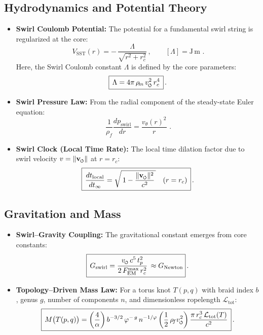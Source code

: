 \documentclass[11pt]{article}
\newcommand{\swirlarrow}{%
    \mathchoice{\mkern-2mu\scriptstyle\boldsymbol{\circlearrowleft}}%
    {\mkern-2mu\scriptstyle\boldsymbol{\circlearrowleft}}%
    {\mkern-2mu\scriptscriptstyle\boldsymbol{\circlearrowleft}}%
    {\mkern-2mu\scriptscriptstyle\boldsymbol{\circlearrowleft}}%
}
\newcommand{\vswirl}{\mathbf{v}_{\swirlarrow}}
\newcommand{\vscore}{v_{\swirlarrow}}                    %
\newcommand{\rhof}{\rho_{\!f}}                           %
\newcommand{\rhom}{\rho_{\!m}}                           %
\newcommand{\rc}{r_c}                                    %
\newcommand{\FmaxEM}{F_{\mathrm{EM}}^{\max}}             %
\begin{document}
\subsection*{Hydrodynamics and Potential Theory}
    \begin{itemize}
    \item \textbf{Swirl Coulomb Potential:} The potential for a fundamental swirl string is regularized at the core:
    \[ \boxed{\,V_{\text{SST}}(r)=-\,\frac{\Lambda}{\sqrt{r^2+\rc^2}}\,,\qquad [\Lambda]=\mathrm{J\,m}\,}\,. \]
    Here, the Swirl Coulomb constant $\Lambda$ is defined by the core parameters:
    \[ \boxed{\,\Lambda = 4\pi\,\rhom\,\vscore^2\,\rc^4\,}\,. \]
    \item \textbf{Swirl Pressure Law:} From the radial component of the steady-state Euler equation:
    \[ \boxed{\,\frac{1}{\rhof}\frac{dp_{\text{swirl}}}{dr}=\frac{v_\theta(r)^2}{r}\,}\,. \]
    \item \textbf{Swirl Clock (Local Time Rate):} The local time dilation factor due to swirl velocity $v = \|\vswirl\|$ at $r=\rc$:
    \[ \boxed{\,\frac{dt_{\text{local}}}{dt_{\infty}} = \sqrt{\,1 - \frac{\|\vswirl\|^2}{c^2}\,}\quad (r=\rc)\,}\,. \]
    \end{itemize}

\subsection*{Gravitation and Mass}
    \begin{itemize}
    \item \textbf{Swirl–Gravity Coupling:} The gravitational constant emerges from core constants:
    \[ \boxed{\,G_{\text{swirl}} = \frac{\vscore\,c^5\,t_p^2}{2\,\FmaxEM\,\rc^2}\, \approx G_{\text{Newton}}}\,. \]
    \item \textbf{Topology–Driven Mass Law:} For a torus knot $T(p,q)$ with braid index $b$, genus $g$, number of components $n$, and dimensionless ropelength $\mathcal{L}_{\text{tot}}$:
    \[ \boxed{\,M\big(T(p,q)\big) = \left(\frac{4}{\alpha}\right) b^{-3/2}\,\varphi^{-\,g}\,n^{-1/\varphi} \left(\frac{1}{2}\,\rhof \vscore^2\right) \frac{\pi\,\rc^3\,\mathcal{L}_{\text{tot}}(T)}{c^2}\,}\,. \]
    \end{itemize}
\end{document}
